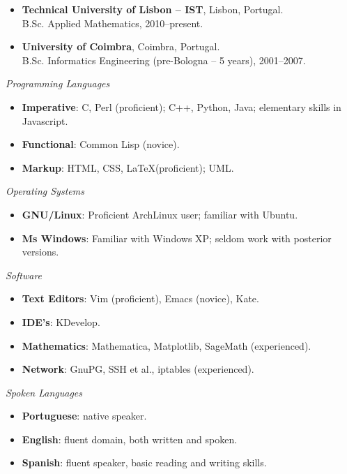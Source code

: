 \documentclass{article}
\newenvironment{topic}[1]
   {{\noindent\large\bfseries\raisebox{0pt}[\height][1ex]{#1}\hrule}%
    \begin{list}{}{%
       \setlength{\leftmargin}{.25cm}}%
    \item[]}
   {\end{list}\medskip}
\begin{document}
\begin{topic}{Formal Education}

\begin{itemize}
\item {\bfseries Technical University of Lisbon -- IST}, Lisbon, Portugal.\\
  B.Sc. Applied Mathematics, 2010--present.
\item {\bfseries University of Coimbra}, Coimbra, Portugal.\\
  B.Sc. Informatics Engineering (pre-Bologna -- 5 years), 2001--2007.
\end{itemize}
\end{topic}

\begin{topic}{Technical Skills}
	{\itshape Programming Languages}  
	\begin{itemize}
		\item{\bfseries Imperative}: C, Perl (proficient); C++, Python, Java;
elementary skills in Javascript.
		\item{\bfseries Functional}: Common Lisp (novice).
		\item{\bfseries Markup}: HTML, CSS, \LaTeX (proficient); UML.
\end{itemize}
	{\itshape Operating Systems} 
  \begin{itemize}
		\item{\bfseries GNU/Linux}: Proficient ArchLinux user; familiar with Ubuntu.
		\item{\bfseries Ms Windows}: Familiar with Windows XP; seldom work with
posterior versions.
	\end{itemize}
{\itshape Software}
  \begin{itemize}
\item{\bfseries Text Editors}: Vim (proficient), Emacs (novice), Kate.
\item{\bfseries IDE's}: KDevelop.
\item{\bfseries Mathematics}: Mathematica, Matplotlib, SageMath (experienced).
\item{\bfseries Network}: GnuPG, SSH et al., iptables (experienced).
  \end{itemize}
\end{topic}

\begin{topic}{Other Skills}
	{\itshape Spoken Languages} 
	\begin{itemize}
		\item {\bfseries Portuguese}: native speaker.
		\item {\bfseries English}: fluent domain, both written and spoken.
		\item {\bfseries Spanish}: fluent speaker, basic reading and writing skills.
	\end{itemize}
\end{topic}
\end{document}
